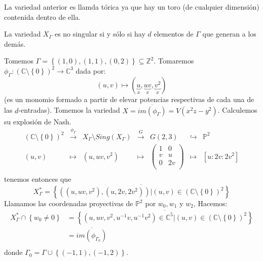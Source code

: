 \documentclass[12pt]{report}
\newcounter{it}
\theoremstyle{largebreak}
\newcommand\cf[3]{\ensuremath{#1:#2\rightarrow#3}}
\begin{document}
    La variedad anterior es llamda tórica ya que hay un toro (de cualquier dimensión) contenida dentro de ella.

    \begin{obs}
        La variedad $X_\Gamma$ es no singular si y sólo si hay $d$ elementos de $\Gamma$ que generan a los demás.
    \end{obs}

    \begin{exa}
        Tomemos $\Gamma=\left\{(1,0),(1,1),(0,2) \right\}\subseteq\mathbb{Z}^2$. Tomaremos $\cf{\phi_\Gamma}{(\mathbb{C}\setminus\left\{0 \right\})^2}{\mathbb{C}^3}$ dada por:
        \begin{equation*}
            (u,v)\mapsto (\underset{x}{\underbrace{u}},\underset{x}{\underbrace{uv}},\underset{x}{\underbrace{v^2}})
        \end{equation*}
        (es un monomio formado a partir de elevar potencias respectivas de cada una de las $d$-entradas). Tomemos la variedad $X=\overline{ im(\phi_\Gamma)}=V(x^2z-y^2)$. Calculemos su explosión de Nash.
        \begin{equation*}
            \begin{array}{ccccccc}
                (\mathbb{C}\setminus\left\{0\right\})^2 & \overset{\phi_\Gamma}{\longrightarrow} & X_\Gamma\setminus Sing(X_\Gamma) & \overset{G}{\longrightarrow} & G(2,3) & \hookrightarrow & \mathbb{P}^2 \\
                (u,v) & \mapsto & (u,uv,v^2) & \mapsto & \left(
                    \begin{array}{cc}
                        1 & 0 \\
                        v & u \\
                        0 & 2v \\
                    \end{array}
                \right) & \mapsto & [u:2v:2v^2] \\
            \end{array}
        \end{equation*}
        tenemos entonces que
        \begin{equation*}
            X^*_\Gamma=\overline{\left\{((u,uv,v^2),(u,2v,2v^2))\Big|(u,v)\in(\mathbb{C}\setminus\left\{0\right\})^2 \right\}}
        \end{equation*}
        Llamamos las coordenadas proyectivas de $\mathbb{P}^2$ por $w_0,w_1$ y $w_2$, Hacemos:
        \begin{equation*}
            \begin{split}
                X_\Gamma^*\cap\left\{w_0\neq0 \right\}&=\overline{\left\{(u,uv,v^2,u^{-1}v,u^{-1}v^2)\in\mathbb{C}^5\Big|(u,v)\in(\mathbb{C}\setminus\left\{0\right\})^2\right\}}\\
                &=\overline{im(\phi_{\Gamma_0})}\\
            \end{split}
        \end{equation*}
        donde $\Gamma_0=\Gamma\cup\left\{(-1,1),(-1,2)\right\}$.
    \end{exa}
\end{document}
